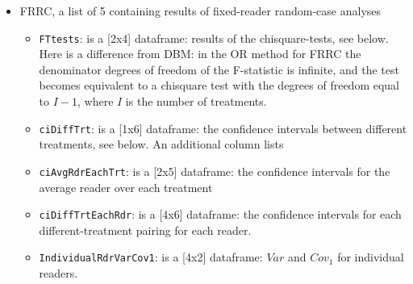 \documentclass[
]{book}
\newenvironment{Shaded}{\begin{snugshade}}{\end{snugshade}}
\newcommand{\CommentTok}[1]{\textcolor[rgb]{0.56,0.35,0.01}{\textit{#1}}}
\newcommand{\NormalTok}[1]{#1}
\newcommand{\SpecialCharTok}[1]{\textcolor[rgb]{0.00,0.00,0.00}{#1}}
\providecommand{\tightlist}{%
  \setlength{\itemsep}{0pt}\setlength{\parskip}{0pt}}
\begin{document}
\begin{Shaded}
\end{Shaded}

\begin{itemize}
\tightlist
\item
  FRRC, a list of 5 containing results of fixed-reader random-case analyses

  \begin{itemize}
  \tightlist
  \item
    \texttt{FTtests}: is a {[}2x4{]} dataframe: results of the chisquare-tests, see below. Here is a difference from DBM: in the OR method for FRRC the denominator degrees of freedom of the F-statistic is infinite, and the test becomes equivalent to a chisquare test with the degrees of freedom equal to \(I-1\), where \(I\) is the number of treatments.
  \item
    \texttt{ciDiffTrt}: is a {[}1x6{]} dataframe: the confidence intervals between different treatments, see below. An additional column lists
  \item
    \texttt{ciAvgRdrEachTrt}: is a {[}2x5{]} dataframe: the confidence intervals for the average reader over each treatment
  \item
    \texttt{ciDiffTrtEachRdr}: is a {[}4x6{]} dataframe: the confidence intervals for each different-treatment pairing for each reader.
  \item
    \texttt{IndividualRdrVarCov1}: is a {[}4x2{]} dataframe: \(Var\) and \(Cov_1\) for individual readers.
  \end{itemize}
\end{itemize}
\end{document}
